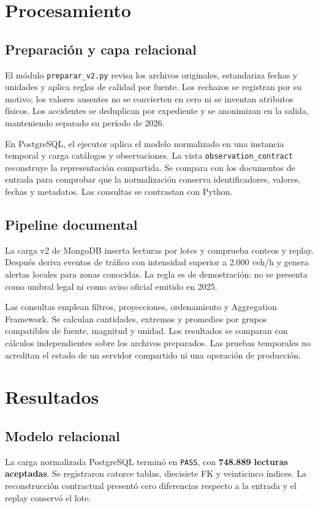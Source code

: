 \documentclass[12pt,letterpaper]{article}
\begin{document}
\section{Procesamiento}

\subsection{Preparación y capa relacional}
El módulo \texttt{preparar\_v2.py} revisa los archivos originales, estandariza
fechas y unidades y aplica reglas de calidad por fuente. Los rechazos se registran
por su motivo; los valores ausentes no se convierten en cero ni se inventan
atributos físicos. Los accidentes se deduplican por expediente y se anonimizan
en la salida, manteniendo separado su período de 2026.

En PostgreSQL, el ejecutor aplica el modelo normalizado en una instancia temporal
y carga catálogos y observaciones. La vista \texttt{observation\_contract}
reconstruye la representación compartida. Se compara con los documentos de
entrada para comprobar que la normalización conserva identificadores, valores,
fechas y metadatos. Las consultas se contrastan con Python.

\subsection{Pipeline documental}
La carga v2 de MongoDB inserta lecturas por lotes y comprueba conteos y replay.
Después deriva eventos de tráfico con intensidad superior a 2.000 veh/h y
genera alertas locales para zonas conocidas. La regla es de demostración:
no se presenta como umbral legal ni como aviso oficial emitido en 2025.

Las consultas emplean filtros, proyecciones, ordenamiento y Aggregation Framework.
Se calculan cantidades, extremos y promedios por grupos compatibles de fuente,
magnitud y unidad. Los resultados se comparan con cálculos independientes sobre
los archivos preparados. Las pruebas temporales no acreditan el estado de un
servidor compartido ni una operación de producción.

\section{Resultados}

\subsection{Modelo relacional}
La carga normalizada PostgreSQL terminó en \texttt{PASS}, con
\textbf{748.889 lecturas aceptadas}. Se registraron catorce tablas, diecisiete FK
y veinticinco índices. La reconstrucción contractual presentó cero diferencias
respecto a la entrada y el replay conservó el lote.
\end{document}
